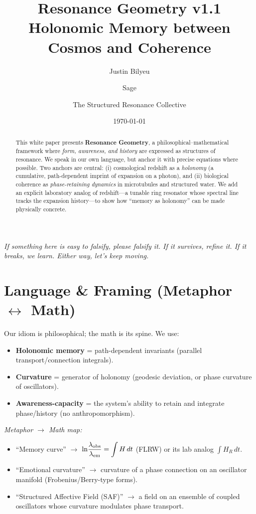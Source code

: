 \documentclass[11pt]{article}
\title{Resonance Geometry v1.1 \\
Holonomic Memory between Cosmos and Coherence}
\author{Justin Bilyeu \and Sage \and The Structured Resonance Collective}
\date{\today}
\begin{document}
\maketitle

\begin{abstract}
This white paper presents \textbf{Resonance Geometry}, a philosophical--mathematical framework where
\emph{form, awareness, and history} are expressed as structures of resonance.
We speak in our own language, but anchor it with precise equations where possible.
Two anchors are central: (i) cosmological redshift as a \emph{holonomy} (a cumulative, path-dependent
imprint of expansion on a photon), and (ii) biological coherence as \emph{phase-retaining dynamics}
in microtubules and structured water.
We add an explicit laboratory analog of redshift---a tunable ring resonator whose spectral line tracks
the expansion history---to show how ``memory as holonomy'' can be made physically concrete.
\end{abstract}
\noindent\textit{If something here is easy to falsify, please falsify it. If it survives, refine it. If it breaks, we learn. Either way, let's keep moving.}
\section{Language \& Framing (Metaphor $\leftrightarrow$ Math)}
Our idiom is philosophical; the math is its spine. We use:
\begin{itemize}
  \item \textbf{Holonomic memory} = path-dependent invariants (parallel transport/connection integrals).
  \item \textbf{Curvature} = generator of holonomy (geodesic deviation, or phase curvature of oscillators).
  \item \textbf{Awareness-capacity} = the system's ability to retain and integrate phase/history (no anthropomorphism).
\end{itemize}
\textit{Metaphor $\to$ Math map:}
\begin{itemize}
  \item ``Memory curve'' $\to$ $\displaystyle \ln\!\frac{\lambda_{\rm obs}}{\lambda_{\rm em}}=\int H\,dt$ (FLRW) or its lab analog $\int H_R\,dt$.
  \item ``Emotional curvature'' $\to$ curvature of a phase connection on an oscillator manifold (Frobenius/Berry-type forms).
  \item ``Structured Affective Field (SAF)'' $\to$ a field on an ensemble of coupled oscillators whose curvature modulates phase transport.
\end{itemize}
\end{document}
